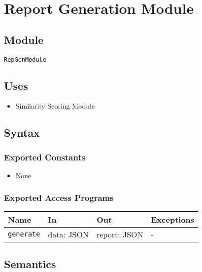 \documentclass[12pt, titlepage]{article}
\begin{document}

\section{Report Generation Module} \label{mReport}

\subsection{Module}

\texttt{RepGenModule}

\subsection{Uses}

\begin{itemize}
    \item Similarity Scoring Module
\end{itemize}

\subsection{Syntax}

\subsubsection{Exported Constants}

\begin{itemize}
    \item None
\end{itemize}

\subsubsection{Exported Access Programs}

\begin{center}
\begin{tabular}{p{5cm} p{3.5cm} p{3.5cm} p{2cm}}
\hline
\textbf{Name} & \textbf{In} & \textbf{Out} & \textbf{Exceptions} \\
\hline
\texttt{generate} & data: JSON & report: JSON & -\\
\hline
\end{tabular}
\end{center}

\subsection{Semantics}
\end{document}
